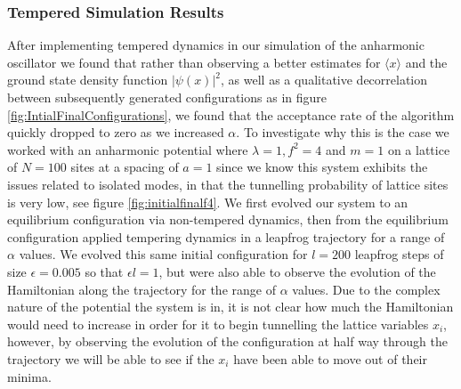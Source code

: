 \documentclass[12pt]{article}
\begin{document}
    \subsubsection{Tempered Simulation Results}
    After implementing tempered dynamics in our simulation of the anharmonic oscillator we found that rather than observing a better estimates for $\langle x \rangle$ and the ground state density function $|\psi\left(x\right)|^2$, as well as a qualitative decorrelation between subsequently generated configurations as in figure \ref{fig:IntialFinalConfigurations}, we found that the acceptance rate of the algorithm quickly dropped to zero as we increased $\alpha$. To investigate why this is the case we worked with an anharmonic potential where $\lambda=1,f^2=4$ and $m=1$ on a lattice of $N=100$ sites at a spacing of $a=1$ since we know this system exhibits the issues related to isolated modes, in that the tunnelling probability of lattice sites is very low, see figure \ref{fig:initialfinalf4}. We first evolved our system to an equilibrium configuration via non-tempered dynamics, then from the equilibrium configuration applied tempering dynamics in a leapfrog trajectory for a range of $\alpha$ values. We evolved this same initial configuration for $l=200$ leapfrog steps of size $\epsilon=0.005$ so that $\epsilon l = 1$, but were also able to observe the evolution of the Hamiltonian along the trajectory for the range of $\alpha$ values. Due to the complex nature of the potential the system is in, it is not clear how much the Hamiltonian would need to increase in order for it to begin tunnelling the lattice variables $x_i$, however, by observing the evolution of the configuration at half way through the trajectory we will be able to see if the $x_i$ have been able to move out of their minima.
\end{document}
